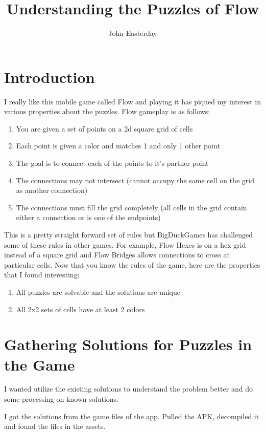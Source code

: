 \documentclass[10pt,a4paper,openany]{article}
\title{Understanding the Puzzles of Flow}
\author{John Easterday}
\begin{document}
\maketitle

\section{Introduction}
I really like this mobile game called Flow and playing it has piqued my interest in various properties about the puzzles. Flow gameplay is as follows:
	
	
\begin{enumerate}
	\item You are given a set of points on a 2d square grid of cells
	\item Each point is given a color and matches 1 and only 1 other point
	\item The goal is to connect each of the points to it's partner point
	\item The connections may not intersect (cannot occupy the same cell on the grid as another connection)
	\item The connections must fill the grid completely (all cells in the grid contain either a connection or is one of the endpoints)
\end{enumerate}
	
This is a pretty straight forward set of rules but BigDuckGames has challenged some of these rules in other games. For example, Flow Hexes is on a hex grid instead of a square grid and Flow Bridges allows connections to cross at particular cells. Now that you know the rules of the game, here are the properties that I found interesting:
	
\begin{enumerate}
	\item All puzzles are solvable and the solutions are unique
	\item All 2x2 sets of cells have at least 2 colors
\end{enumerate}

\section{Gathering Solutions for Puzzles in the Game}

I wanted utilize the existing solutions to understand the problem better and do some processing on known solutions.

I got the solutions from the game files of the app. Pulled the APK, decompiled it and found the files in the assets.
\end{document}
